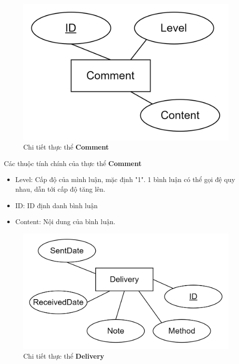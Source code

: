 \newpage
\begin{figure}[h]
    \centering
    \includegraphics[scale = 0.20]{img/db/comment.png}
    \vspace{1cm}
    \caption{Chi tiết thực thể \textbf{Comment}}
    \label{fig:taskAssignment}
\end{figure}
Các thuộc tính chính của thực thể \textbf{Comment}
\begin{itemize}
    \item Level: Cấp độ của mình luận, mặc định "1". 1 bình luận có thể gọi đệ quy nhau, dẫn tới cấp độ tăng lên. 
    \item ID: ID định danh bình luận
    \item Content: Nội dung của bình luận.
\end{itemize}

\begin{figure}[h]
    \centering
    \includegraphics[scale = 0.20]{img/db/delivery.png}
    \vspace{1cm}
    \caption{Chi tiết thực thể \textbf{Delivery}}
    \label{fig:taskAssignment}
\end{figure}

